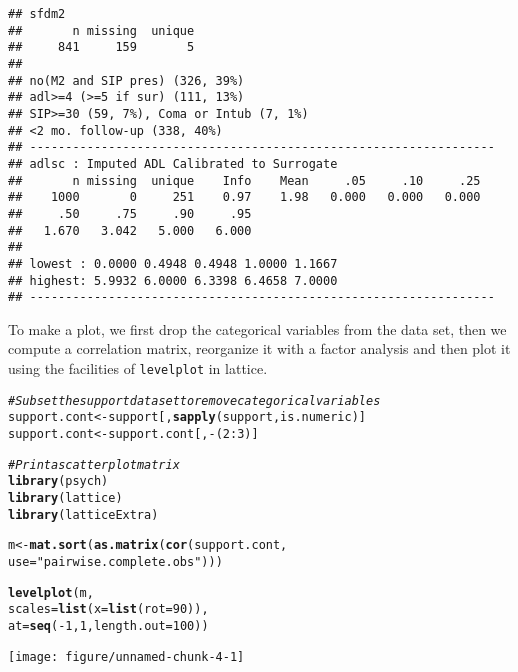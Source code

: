 \documentclass[headinclude=true, headsepline=true, DIV14]{scrartcl}\usepackage[]{graphicx}\usepackage[]{color}
\makeatletter
\def\maxwidth{ %
  \ifdim\Gin@nat@width>\linewidth
    \linewidth
  \else
    \Gin@nat@width
  \fi
}
\newcommand{\hlnum}[1]{\textcolor[rgb]{0.686,0.059,0.569}{#1}}%
\newcommand{\hlstr}[1]{\textcolor[rgb]{0.192,0.494,0.8}{#1}}%
\newcommand{\hlcom}[1]{\textcolor[rgb]{0.678,0.584,0.686}{\textit{#1}}}%
\newcommand{\hlopt}[1]{\textcolor[rgb]{0,0,0}{#1}}%
\newcommand{\hlstd}[1]{\textcolor[rgb]{0.345,0.345,0.345}{#1}}%
\newcommand{\hlkwb}[1]{\textcolor[rgb]{0.69,0.353,0.396}{#1}}%
\newcommand{\hlkwc}[1]{\textcolor[rgb]{0.333,0.667,0.333}{#1}}%
\newcommand{\hlkwd}[1]{\textcolor[rgb]{0.737,0.353,0.396}{\textbf{#1}}}%
\newenvironment{kframe}{%
 \def\at@end@of@kframe{}%
 \ifinner\ifhmode%
  \def\at@end@of@kframe{\end{minipage}}%
  \begin{minipage}{\columnwidth}%
 \fi\fi%
 \def\FrameCommand##1{\hskip\@totalleftmargin \hskip-\fboxsep
 \colorbox{shadecolor}{##1}\hskip-\fboxsep
     \hskip-\linewidth \hskip-\@totalleftmargin \hskip\columnwidth}%
 \MakeFramed {\advance\hsize-\width
   \@totalleftmargin\z@ \linewidth\hsize
   \@setminipage}}%
 {\par\unskip\endMakeFramed%
 \at@end@of@kframe}
\newenvironment{knitrout}{}{} %
\makeatother
\begin{document}
\begin{knitrout}
\begin{kframe}
\begin{verbatim}
## sfdm2 
##       n missing  unique 
##     841     159       5 
## 
## no(M2 and SIP pres) (326, 39%) 
## adl>=4 (>=5 if sur) (111, 13%) 
## SIP>=30 (59, 7%), Coma or Intub (7, 1%) 
## <2 mo. follow-up (338, 40%) 
## -----------------------------------------------------------------
## adlsc : Imputed ADL Calibrated to Surrogate 
##       n missing  unique    Info    Mean     .05     .10     .25 
##    1000       0     251    0.97    1.98   0.000   0.000   0.000 
##     .50     .75     .90     .95 
##   1.670   3.042   5.000   6.000 
## 
## lowest : 0.0000 0.4948 0.4948 1.0000 1.1667
## highest: 5.9932 6.0000 6.3398 6.4658 7.0000 
## -----------------------------------------------------------------
\end{verbatim}
\end{kframe}
\end{knitrout}

To make a plot, we first drop the categorical variables from the data set, then
we compute a correlation matrix, reorganize it with a factor
analysis and then plot it using the facilities of \texttt{levelplot} in
lattice.

\begin{knitrout}
\color{fgcolor}\begin{kframe}
\begin{alltt}
\hlcom{# Subset the support data set to remove categorical variables}
\hlstd{support.cont} \hlkwb{<-} \hlstd{support[,} \hlkwd{sapply}\hlstd{(support, is.numeric)]}
\hlstd{support.cont} \hlkwb{<-} \hlstd{support.cont[,} \hlopt{-}\hlstd{(}\hlnum{2}\hlopt{:}\hlnum{3}\hlstd{)]}

\hlcom{# Print a scatterplot matrix}
\hlkwd{library}\hlstd{(psych)}
\hlkwd{library}\hlstd{(lattice)}
\hlkwd{library}\hlstd{(latticeExtra)}

\hlstd{m} \hlkwb{<-} \hlkwd{mat.sort}\hlstd{(}\hlkwd{as.matrix}\hlstd{(}\hlkwd{cor}\hlstd{(support.cont,}
                            \hlkwc{use} \hlstd{=} \hlstr{"pairwise.complete.obs"}\hlstd{)))}

\hlkwd{levelplot}\hlstd{(m,}
          \hlkwc{scales} \hlstd{=} \hlkwd{list}\hlstd{(}\hlkwc{x} \hlstd{=} \hlkwd{list}\hlstd{(}\hlkwc{rot} \hlstd{=} \hlnum{90}\hlstd{)),}
          \hlkwc{at} \hlstd{=} \hlkwd{seq}\hlstd{(}\hlopt{-}\hlnum{1}\hlstd{,} \hlnum{1}\hlstd{,} \hlkwc{length.out} \hlstd{=} \hlnum{100}\hlstd{))}
\end{alltt}
\end{kframe}

{\centering \texttt{[image: figure/unnamed-chunk-4-1]} 

}



\end{knitrout}
\end{document}
